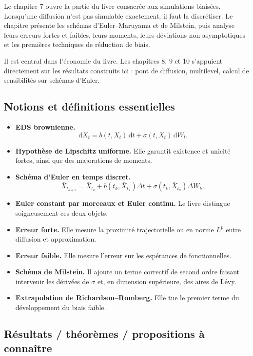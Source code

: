 \documentclass[11pt,a4paper]{article}
\newcommand{\ud}{\,\mathrm{d}}
\begin{document}
Le chapitre 7 ouvre la partie du livre consacrée aux simulations biaisées. Lorsqu'une diffusion n'est pas simulable exactement, il faut la discrétiser. Le chapitre présente les schémas d'Euler--Maruyama et de Milstein, puis analyse leurs erreurs fortes et faibles, leurs moments, leurs déviations non asymptotiques et les premières techniques de réduction de biais.

Il est central dans l'économie du livre. Les chapitres 8, 9 et 10 s'appuient directement sur les résultats construits ici : pont de diffusion, multilevel, calcul de sensibilités sur schémas d'Euler.

\subsection{Notions et définitions essentielles}

\begin{itemize}
  \item \textbf{EDS brownienne.}
  \[
    \ud X_t=b(t,X_t)\ud t+\sigma(t,X_t)\ud W_t.
  \]
  \item \textbf{Hypothèse de Lipschitz uniforme.} Elle garantit existence et unicité fortes, ainsi que des majorations de moments.
  \item \textbf{Schéma d'Euler en temps discret.}
  \[
    \bar X_{t_{k+1}}=\bar X_{t_k}+b(t_k,\bar X_{t_k})\Delta t+\sigma(t_k,\bar X_{t_k})\Delta W_k.
  \]
  \item \textbf{Euler constant par morceaux et Euler continu.} Le livre distingue soigneusement ces deux objets.
  \item \textbf{Erreur forte.} Elle mesure la proximité trajectorielle ou en norme $L^p$ entre diffusion et approximation.
  \item \textbf{Erreur faible.} Elle mesure l'erreur sur les espérances de fonctionnelles.
  \item \textbf{Schéma de Milstein.} Il ajoute un terme correctif de second ordre faisant intervenir les dérivées de $\sigma$ et, en dimension supérieure, des aires de Lévy.
  \item \textbf{Extrapolation de Richardson--Romberg.} Elle tue le premier terme du développement du biais faible.
\end{itemize}

\subsection{Résultats / théorèmes / propositions à connaître}
\end{document}
